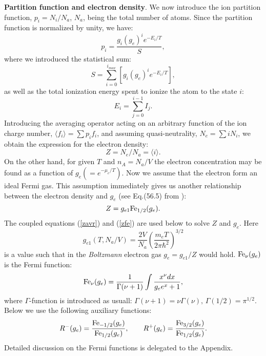 {\bf Partition function and electron density}. We now introduce the ion partition function, $p_i=N_i/N_a$, $N_a$, being 
the total number of atoms. Since the partition function is normalized by unity,
we have:
\begin{equation}
p_i=\frac{g_i(g_e)^ie^{-E_i/T}}S,
\end{equation}
where we introduced the statistical sum:
\begin{equation}
S=\sum_{i=0}^{i_{max}}\left[g_i(g_e)^ie^{-E_i/T}\right],
\end{equation}
as well as the total ionization energy spent to ionize the atom to the state $i$:
\begin{equation}
E_i=\sum_{j=0}^{i-1}I_j.
\end{equation}
Introducing the averaging operator acting on an arbitrary function of the ion charge number, $\langle f_i\rangle=\sum p_if_i$, and assuming quasi-neutrality, $N_e = \sum{i N_i}$, we
obtain the expression for the electron density:
\begin{equation}\label{zavr}
Z=N_e/N_a=\langle i\rangle.
\end{equation}
On the other hand, for given $T$ and $n_A=N_a/V$ the electron concentration may be found as a function of $g_e(=e^{-\mu_e/T})$.
Now we assume that the electron form an ideal Fermi gas.
This assumption immediately gives us another relationship between the electron density and $g_e$ (see Eq.(56.5) from \cite{ll}):
\begin{equation}\label{zfe}
Z=g_{e1}{\rm Fe}_{1/2}(g_e).
\end{equation}
The coupled equations (\ref{zavr}) and (\ref{zfe}) are used below to solve $Z$ and $g_e$. Here
\begin{equation}
g_{e1}(T,N_a/V)=\frac{2V}{N_a}\left(\frac{m_eT}{2\pi \hbar^2}\right)^{3/2}
\end{equation}
is a value such that in the {\it Boltzmann} electron gas $g_e = g_{e1}/Z$ would hold. ${\rm Fe}_\nu(g_e)$ is the Fermi function:
\begin{equation}
{\rm Fe}_\nu(g_e)=\frac1{\Gamma(\nu+1)}\int{\frac{x^\nu dx}{g_ee^x+1}},
\end{equation}
where $\Gamma$-function is introduced as usuall: $\Gamma(\nu+1)=\nu \Gamma(\nu),\,\Gamma(1/2)=\pi^{1/2}$.
Below we use the following auxiliary functions:
\begin{equation}
R^-(g_e)=\frac{{\rm Fe}_{-1/2}(g_e)}{{\rm Fe}_{1/2}(g_e)}, \qquad
R^+(g_e)=\frac{{\rm Fe}_{3/2}(g_e)}{{\rm Fe}_{1/2}(g_e)}.
\end{equation}
Detailed discussion on the Fermi functions is delegated to the Appendix.

